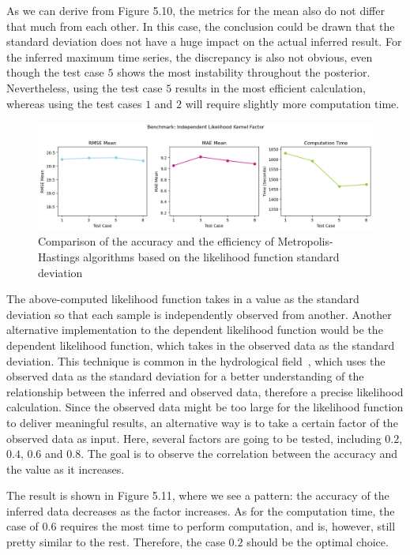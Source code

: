 As we can derive from Figure 5.10, the metrics for the mean also do not differ that much from each other. In this case, the conclusion could be drawn that the standard deviation does not have a huge impact on the actual inferred result. For the inferred maximum time series, the discrepancy is also not obvious, even though the test case $5$ shows the most instability throughout the posterior. Nevertheless, using the test case $5$ results in the most efficient calculation, whereas using the test cases $1$ and $2$ will require slightly more computation time.


\begin{figure}[H]
    \centering
    \includegraphics[width=1\textwidth]{figures/basic_mh/benchmark/sensitivity_likelihood_independent.png}
    \captionsetup{width=.8\textwidth}
    \caption{Comparison of the accuracy and the efficiency of Metropolis-Hastings algorithms based on the likelihood function standard deviation}
    \label{fig:enter-label}
\end{figure}



The above-computed likelihood function takes in a value as the standard deviation so that each sample is independently observed from another. Another alternative implementation to the dependent likelihood function would be the dependent likelihood function, which takes in the observed data as the standard deviation. This technique is common in the hydrological field~\cite{dream}, which uses the observed data as the standard deviation for a better understanding of the relationship between the inferred and observed data, therefore a precise likelihood calculation. Since the observed data might be too large for the likelihood function to deliver meaningful results, an alternative way is to take a certain factor of the observed data as input. Here, several factors are going to be tested, including $0.2$, $0.4$, $0.6$ and $0.8$. The goal is to observe the correlation between the accuracy and the value as it increases.


The result is shown in Figure 5.11, where we see a pattern: the accuracy of the inferred data decreases as the factor increases. As for the computation time, the case of $0.6$ requires the most time to perform computation, and is, however, still pretty similar to the rest. Therefore, the case $0.2$ should be the optimal choice.

